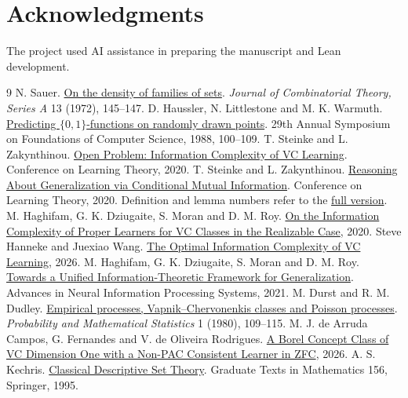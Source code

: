 \documentclass[11pt]{article}
\theoremstyle{definition}\newtheorem{definition}[theorem]{Definition}
\begin{document}
\section*{Acknowledgments}
The project used AI assistance in preparing the manuscript and Lean development.

{\small
\begin{thebibliography}{9}
\setlength{\itemsep}{1pt}
 N. Sauer.
\href{https://doi.org/10.1016/0097-3165(72)90019-2}{On the density of families of sets}.
\emph{Journal of Combinatorial Theory, Series A} 13 (1972), 145--147.
 D. Haussler, N. Littlestone and M. K. Warmuth.
\href{https://mwarmuth.bitbucket.io/pubs/C10.pdf}{Predicting $\{0,1\}$-functions on randomly drawn points}.
29th Annual Symposium on Foundations of Computer Science, 1988, 100--109.
 T. Steinke and L. Zakynthinou.
\href{https://proceedings.mlr.press/v125/steinke20b.html}{Open Problem: Information Complexity of VC Learning}.
Conference on Learning Theory, 2020.
 T. Steinke and L. Zakynthinou.
\href{https://proceedings.mlr.press/v125/steinke20a.html}{Reasoning About Generalization via Conditional Mutual Information}.
Conference on Learning Theory, 2020. Definition and lemma numbers refer to the
\href{https://arxiv.org/abs/2001.09122}{full version}.
 M. Haghifam, G. K. Dziugaite, S. Moran and D. M. Roy.
\href{https://arxiv.org/abs/2011.02970}{On the Information Complexity of Proper Learners for VC Classes in the Realizable Case}, 2020.
 Steve Hanneke and Juexiao Wang.
\href{https://arxiv.org/abs/2610.10600}{The Optimal Information Complexity of VC Learning}, 2026.
 M. Haghifam, G. K. Dziugaite, S. Moran and D. M. Roy.
\href{https://arxiv.org/abs/2111.05275}{Towards a Unified Information-Theoretic Framework for Generalization}.
Advances in Neural Information Processing Systems, 2021.
 M. Durst and R. M. Dudley.
\href{https://www.math.uni.wroc.pl/~pms/files/1.2/Article/1.2.2.pdf}{Empirical processes, Vapnik--Chervonenkis classes and Poisson processes}.
\emph{Probability and Mathematical Statistics} 1 (1980), 109--115.
 M. J. de Arruda Campos, G. Fernandes and V. de Oliveira Rodrigues.
\href{https://arxiv.org/abs/2608.30246}{A Borel Concept Class of VC Dimension One with a Non-PAC Consistent Learner in ZFC}, 2026.
 A. S. Kechris.
\href{https://doi.org/10.1007/978-1-4612-4190-4}{Classical Descriptive Set Theory}.
Graduate Texts in Mathematics 156, Springer, 1995.
\end{thebibliography}}
\end{document}
